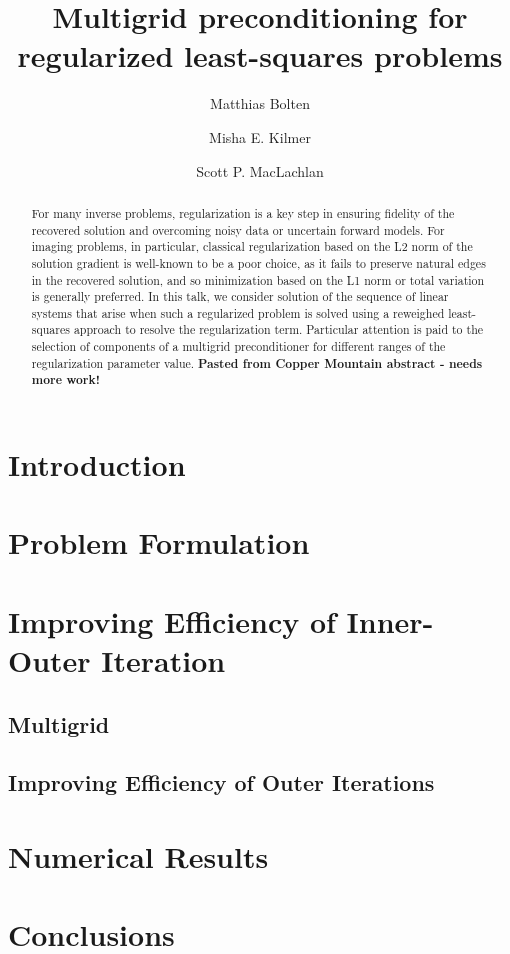\documentclass[review]{siamart171218}
\title{Multigrid preconditioning for regularized least-squares problems}
\author{Matthias Bolten \and Misha E. Kilmer \and Scott P. MacLachlan}
\begin{document}
\maketitle

\begin{abstract}
For many inverse problems, regularization is a key step in ensuring
fidelity of the recovered solution and overcoming noisy data or
uncertain forward models. For imaging problems, in particular,
classical regularization based on the L2 norm of the solution gradient
is well-known to be a poor choice, as it fails to preserve natural
edges in the recovered solution, and so minimization based on the L1
norm or total variation is generally preferred. In this talk, we
consider solution of the sequence of linear systems that arise when
such a regularized problem is solved using a reweighed least-squares
approach to resolve the regularization term. Particular attention is
paid to the selection of components of a multigrid preconditioner for
different ranges of the regularization parameter value.  {\bf Pasted
  from Copper Mountain abstract - needs more work!}
\end{abstract}


\section{Introduction}


\section{Problem Formulation}


\section{Improving Efficiency of Inner-Outer Iteration}


\subsection{Multigrid}\label{sec:multigrid}


\subsection{Improving Efficiency of Outer Iterations}



\section{Numerical Results}\label{sec:numerical}


\section{Conclusions}

 
\end{document}
